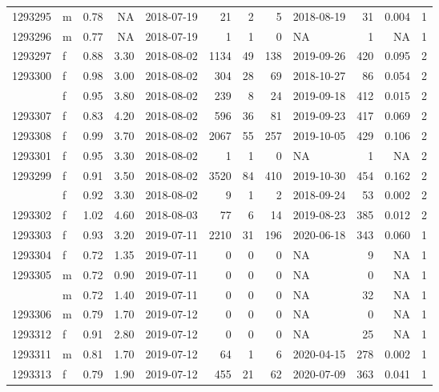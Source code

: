 \documentclass[
  authoryear,
  review,
  3p]{elsarticle}
\begin{document}
\begin{table}[H]
\begin{tabular}{llrrlrrrlrrr}
1293295 & m & 0.78 & NA & 2018-07-19 & 21 & 2 & 5 & 2018-08-19 & 31 & 0.004 & 1\\
1293296 & m & 0.77 & NA & 2018-07-19 & 1 & 1 & 0 & NA & 1 & NA & 1\\
1293297 & f & 0.88 & 3.30 & 2018-08-02 & 1134 & 49 & 138 & 2019-09-26 & 420 & 0.095 & 2\\
1293300 & f & 0.98 & 3.00 & 2018-08-02 & 304 & 28 & 69 & 2018-10-27 & 86 & 0.054 & 2\\
\addlinespace
1293298 & f & 0.95 & 3.80 & 2018-08-02 & 239 & 8 & 24 & 2019-09-18 & 412 & 0.015 & 2\\
1293307 & f & 0.83 & 4.20 & 2018-08-02 & 596 & 36 & 81 & 2019-09-23 & 417 & 0.069 & 2\\
1293308 & f & 0.99 & 3.70 & 2018-08-02 & 2067 & 55 & 257 & 2019-10-05 & 429 & 0.106 & 2\\
1293301 & f & 0.95 & 3.30 & 2018-08-02 & 1 & 1 & 0 & NA & 1 & NA & 2\\
1293299 & f & 0.91 & 3.50 & 2018-08-02 & 3520 & 84 & 410 & 2019-10-30 & 454 & 0.162 & 2\\
\addlinespace
1293309 & f & 0.92 & 3.30 & 2018-08-02 & 9 & 1 & 2 & 2018-09-24 & 53 & 0.002 & 2\\
1293302 & f & 1.02 & 4.60 & 2018-08-03 & 77 & 6 & 14 & 2019-08-23 & 385 & 0.012 & 2\\
1293303 & f & 0.93 & 3.20 & 2019-07-11 & 2210 & 31 & 196 & 2020-06-18 & 343 & 0.060 & 1\\
1293304 & f & 0.72 & 1.35 & 2019-07-11 & 0 & 0 & 0 & NA & 9 & NA & 1\\
1293305 & m & 0.72 & 0.90 & 2019-07-11 & 0 & 0 & 0 & NA & 0 & NA & 1\\
\addlinespace
1293310 & m & 0.72 & 1.40 & 2019-07-11 & 0 & 0 & 0 & NA & 32 & NA & 1\\
1293306 & m & 0.79 & 1.70 & 2019-07-12 & 0 & 0 & 0 & NA & 0 & NA & 1\\
1293312 & f & 0.91 & 2.80 & 2019-07-12 & 0 & 0 & 0 & NA & 25 & NA & 1\\
1293311 & m & 0.81 & 1.70 & 2019-07-12 & 64 & 1 & 6 & 2020-04-15 & 278 & 0.002 & 1\\
1293313 & f & 0.79 & 1.90 & 2019-07-12 & 455 & 21 & 62 & 2020-07-09 & 363 & 0.041 & 1\\
\bottomrule
\end{tabular}
\end{table}
\end{document}
